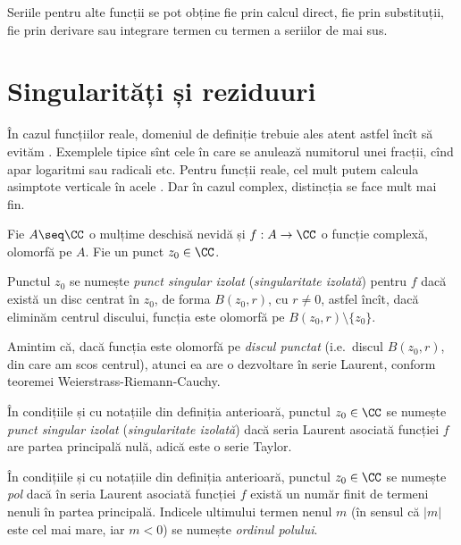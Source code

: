 Seriile pentru alte funcții se pot obține fie prin calcul direct, fie
prin substituții, fie prin derivare sau integrare termen cu termen a
seriilor de mai sus.

\section{Singularități și reziduuri}

În cazul funcțiilor reale, domeniul de definiție trebuie ales atent astfel încît
să evităm . Exemplele tipice sînt cele în care se
anulează numitorul unei fracții, cînd apar logaritmi sau radicali etc.
Pentru funcții reale, cel mult putem calcula asimptote verticale în acele
. Dar în cazul complex, distincția se face mult mai fin.

\begin{definition}\label{def:sing-iz}
  Fie $ A \seq \CC $ o mulțime deschisă nevidă și $ f : A \to \CC $ o funcție
  complexă, olomorfă pe $ A $. Fie un punct $ z_0 \in \CC $.

  Punctul $ z_0 $ se numește \emph{punct singular izolat} (\emph{singularitate izolată})
  pentru $ f $ dacă există un disc centrat în $ z_0 $, de forma $ B(z_0, r) $, cu
  $ r \neq 0 $, astfel încît, dacă eliminăm centrul discului, funcția este
  olomorfă pe $ B(z_0, r) \setminus \{ z_0 \} $.
\end{definition}

Amintim că, dacă funcția este olomorfă pe \emph{discul punctat} (i.e.\ discul
$ B(z_0, r) $, din care am scos centrul), atunci ea are o dezvoltare în serie Laurent,
conform teoremei Weierstrass-Riemann-Cauchy.

\begin{definition}\label{def:sing-ap}
  În condițiile și cu notațiile din definiția anterioară, punctul $ z_0 \in \CC $
  se numește \emph{punct singular izolat} (\emph{singularitate izolată}) dacă
  seria Laurent asociată funcției $ f $ are partea principală nulă, adică este
  o serie Taylor.
\end{definition}

\begin{definition}\label{def:pol}
  În condițiile și cu notațiile din definiția anterioară, punctul $ z_0 \in \CC $
  se numește \emph{pol} dacă în seria Laurent asociată funcției $ f $ există
  un număr finit de termeni nenuli în partea principală. Indicele ultimului
  termen nenul $ m $ (în sensul că $ |m| $ este cel mai mare, iar $ m < 0 $)
  se numește \emph{ordinul polului}.
\end{definition}

